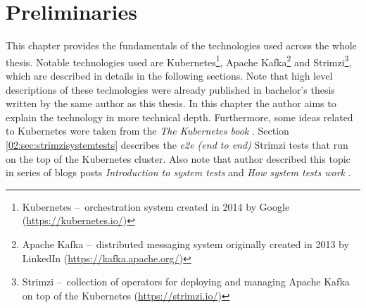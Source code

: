 \chapter{Preliminaries}

This chapter provides the fundamentals of the technologies used across the whole thesis.
Notable technologies used are Kubernetes\footnote{Kubernetes \---\ orchestration system created in 2014 by Google (\url{https://kubernetes.io/})}, Apache Kafka\footnote{Apache Kafka \---\ distributed messaging system originally created in 2013 by LinkedIn (\url{https://kafka.apache.org/})} and Strimzi\footnote{Strimzi \---\ collection of operators for deploying and managing Apache Kafka on top of the Kubernetes (\url{https://strimzi.io/})}, which are described in details in the following sections.
Note that high level descriptions of these technologies were already published in bachelor's thesis \cite{02-bachelor-thesis} written by the same author as this thesis.
In this chapter the author aims to explain the technology in more technical depth.
Furthermore, some ideas related to Kubernetes were taken from the \emph{The Kubernetes book} \cite{kubernetesBook}.
Section \ref{02:sec:strimzisystemtests} describes the \emph{e2e (end to end)}  Strimzi tests that run on the top of the Kubernetes cluster.
Also note that author described this topic in series of blogs posts \emph{Introduction to system tests} \cite{02-blogpost-introduction-to-systemtest} and \emph{How system tests work} \cite{02-blogpost-how-systemtest-work}.